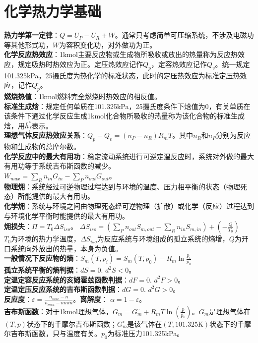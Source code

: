 \documentclass[a4paper,9pt]{ctexart}
\begin{document}
\section{化学热力学基础}
\noindent
\textbf{热力学第一定律}：$Q=U_P-U_R+W$。通常只考虑简单可压缩系统，不涉及电磁功等其他形式功，$W$为容积变化功，对外做功为正。\\
\textbf{化学反应热效应}：1kmol主要反应物或生成物所吸收或放出的热量称为反应热效应，规定吸热时热效应为正。定压热效应记作$Q_p$，定容热效应记作$Q_v$。统一规定101.325kPa，25摄氏度为热化学的标准状态，此时的定压热效应为标准定压热效应，记作$Q_p^\circ$。\\
\textbf{燃烧热值}：1kmol燃料完全燃烧时热效应的相反值。\\
\textbf{标准生成焓}：规定任何单质在101.325kPa，25摄氏度条件下焓值为0，有关单质在该条件下通过化学反应生成1kmol化合物所吸收的热量称为该化合物的标准生成焓，用$\bar{h}^\circ_f$表示。\\
\textbf{理想气体反应热效应关系}：$Q_p-Q_v=(n_P-n_R)R_mT$。其中$n_R$和$n_P$分别为反应物和生成物的总摩尔数。\\
\textbf{化学反应中的最大有用功}：稳定流动系统进行可逆定温反应时，系统对外做的最大有用功等于系统吉布斯函数的减少。\\$W_{max}=\sum_Rn_{in}G_{in}-\sum_Pn_{out}G_{out}$。\\
\textbf{物理㶲}：系统经过可逆物理过程达到与环境的温度、压力相平衡的状态（物理死态）所能提供的最大有用功。\\
\textbf{化学㶲}：系统与环境之间由物理死态经可逆物理（扩散）或化学（反应）过程达到与环境化学平衡时能提供的最大有用功。\\
\textbf{㶲损失}：$\Pi=T_0\Delta S_{iso}$。
$\Delta S_{iso}=\left(\sum_Pn_{out}S_{m,out}-\sum_Rn_{in}S_{m,in}\right)+\left(-\frac{Q}{T_0}\right)$\\
$T_0$为环境的热力学温度，$\Delta S_{iso}$为反应系统与环境组成的孤立系统的熵增，$Q$为开口系统向外放出的热量，本身为负值。\\
\textbf{一般情况下反应物的熵}：$S_m(T,p_i)=S_m(T,p_0)-R_m\ln\frac{p_i}{p_0}$\\
\textbf{孤立系统平衡的熵判据}：$dS=0$. $d^2S<0$。\\
\textbf{定温定容反应系统的亥姆霍兹函数判据}：$dF=0$. $d^2F>0$。\\
\textbf{定温定压反应系统的吉布斯函数判据}：$dG=0$. $d^2G>0$。\\
\textbf{反应度}：$\varepsilon=\frac{n_{max}-n}{n_{max}-n{min}}$。\textbf{离解度}：
$\alpha=1-\varepsilon$。\\
\textbf{吉布斯函数}：对于1kmol理想气体，$G_m=G_m^\circ+R_mT\ln\left(\frac{p}{p_0}\right)$。$G_m$是理想气体在$(T,p)$状态下的千摩尔吉布斯函数；$G_m^\circ$是该气体在$(T,101.325\mathrm{K})$状态下的千摩尔吉布斯函数，只与温度有关。$p_0$为标准压力101.325kPa。\\
\end{document}
